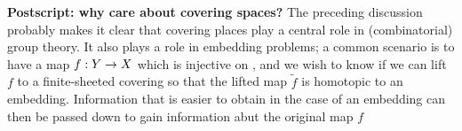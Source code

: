 \documentclass[12pt]{article}
\begin{document}
\msk

{\bf Postscript: why care about covering spaces?} The preceding discussion
probably makes it clear that covering places play a central role in
(combinatorial) group theory. It also plays a role in embedding 
problems; a common scenario is to have a map $f:Y\rightarrow X$ which is 
injective on \mpu , and we wish to know if we can lift $f$ to a 
finite-sheeted covering so that the lifted map $\widetilde{f}$ is 
homotopic to an embedding. Information that is easier to obtain 
in the case of an embedding can then be passed down to gain information
abut the original map $f$



\vfill
\end{document}
